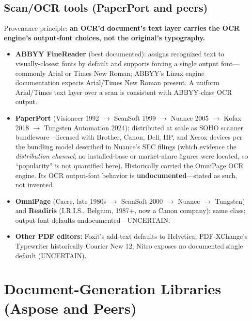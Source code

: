 \documentclass[10pt,a4paper]{article}
\begin{document}
\subsection{Scan/OCR tools (PaperPort and peers)}\label{sec:ocr}

Provenance principle: \textbf{an OCR'd document's text layer carries the OCR engine's
output-font choices, not the original's typography.}

\begin{itemize}[leftmargin=1.2em,itemsep=2pt]
\item \textbf{ABBYY FineReader} (best documented): assigns recognized text to
visually-closest fonts by default and supports forcing a single output font---commonly
Arial or Times New Roman; ABBYY's Linux engine documentation expects Arial/Times New
Roman present. A uniform Arial/Times text layer over a scan is consistent with
ABBYY-class OCR output.\cite{p-abbyy,p-abbyy-2,p-abbyy-3}
\item \textbf{PaperPort} (Visioneer 1992 $\rightarrow$ ScanSoft 1999 $\rightarrow$ Nuance
2005 $\rightarrow$ Kofax 2018 $\rightarrow$ Tungsten Automation 2024): distributed at
scale as SOHO scanner bundleware---licensed with Brother, Canon, Dell, HP, and Xerox
devices per the bundling model described in Nuance's SEC filings (which evidence the
\emph{distribution channel}; no installed-base or market-share figures were located, so
``popularity'' is not quantified here). Historically carried the OmniPage OCR engine. Its
OCR output-font behavior is \textbf{undocumented}---stated as such, not
invented.\cite{p-paperport,p-paperport-2,p-paperport-3}
\item \textbf{OmniPage} (Caere, late 1980s $\rightarrow$ ScanSoft 2000 $\rightarrow$
Nuance $\rightarrow$ Tungsten) and \textbf{Readiris} (I.R.I.S., Belgium, 1987+, now a
Canon company): same class; output-font defaults undocumented---UNCERTAIN.\cite{p-omnipage,p-omnipage-2}
\item \textbf{Other PDF editors:} Foxit's add-text defaults to Helvetica; PDF-XChange's
Typewriter historically Courier New 12; Nitro exposes no documented single default
(UNCERTAIN).\cite{p-editors,p-editors-2,p-editors-3}
\end{itemize}

\section{Document-Generation Libraries (Aspose and Peers)}\label{sec:libraries}
\end{document}
